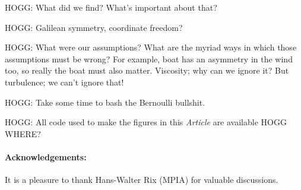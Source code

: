 \documentclass{article}
\newcommand{\documentname}{\textsl{Article}}
\begin{document}
HOGG: What did we find? What's important about that?

HOGG: Galilean symmetry, coordinate freedom?

HOGG: What were our assumptions? What are the myriad ways in which those assumptions must be wrong? For example, boat has an asymmetry in the wind too, so really the boat must also matter. Viscosity; why can we ignore it? But turbulence; we can't ignore that!

HOGG: Take some time to bash the Bernoulli bullshit.

HOGG: All code used to make the figures in this \documentname{} are available HOGG WHERE?

\paragraph{Acknowledgements:}
It is a pleasure to thank Hans-Walter Rix (MPIA) for valuable discussions.

\raggedright
\printbibliography
\end{document}
